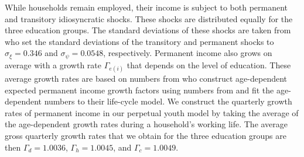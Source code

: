 \documentclass[../HAFiscal]{subfiles}
\begin{document}

While households remain employed, their income is subject to both permanent and transitory idiosyncratic shocks. These shocks are distributed equally for the three education groups. The standard deviations of these shocks are taken from \cite{carroll2020sticky} who set the standard deviations of the transitory and permanent shocks to $\sigma_\xi=0.346$ and $\sigma_\psi=0.0548$, respectively. Permanent income also grows on average with a growth rate $\Gamma_{e(i)}$ that depends on the level of education. These average growth rates are based on numbers from \cite{carroll2020modeling} who construct age-dependent expected permanent income growth factors using numbers from \cite{cagetti2003wealth} and fit the age-dependent numbers to their life-cycle model. We construct the quarterly growth rates of permanent income in our perpetual youth model by taking the average of the age-dependent growth rates during a household's working life. The average gross quarterly growth rates that we obtain for the three education groups are then $\Gamma_d=1.0036$, $\Gamma_h=1.0045$, and $\Gamma_c=1.0049$.
\end{document}
